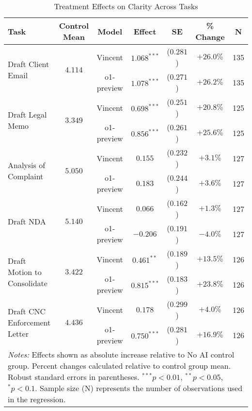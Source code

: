 \begin{table}[!htbp]
\centering
\caption{Treatment Effects on Clarity Across Tasks}
\label{tab:clarity_effects}
\begin{tabular}{lcccccc}
\hline\hline
Task & Control Mean & Model & Effect & SE & \% Change & N \\
\hline
\multirow{2}{*}{Draft Client Email} & \multirow{2}{*}{$4.114$} & Vincent & $1.068^{***}$ & ($0.281$) & $+26.0\%$ & 135 \\
& & o1-preview & $1.078^{***}$ & ($0.271$) & $+26.2\%$ & 135 \\
\hline
\multirow{2}{*}{Draft Legal Memo} & \multirow{2}{*}{$3.349$} & Vincent & $0.698^{***}$ & ($0.251$) & $+20.8\%$ & 125 \\
& & o1-preview & $0.856^{***}$ & ($0.261$) & $+25.6\%$ & 125 \\
\hline
\multirow{2}{*}{Analysis of Complaint} & \multirow{2}{*}{$5.050$} & Vincent & $0.155$ & ($0.232$) & $+3.1\%$ & 127 \\
& & o1-preview & $0.183$ & ($0.244$) & $+3.6\%$ & 127 \\
\hline
\multirow{2}{*}{Draft NDA} & \multirow{2}{*}{$5.140$} & Vincent & $0.066$ & ($0.162$) & $+1.3\%$ & 127 \\
& & o1-preview & $-0.206$ & ($0.191$) & $-4.0\%$ & 127 \\
\hline
\multirow{2}{*}{Draft Motion to Consolidate} & \multirow{2}{*}{$3.422$} & Vincent & $0.461^{**}$ & ($0.189$) & $+13.5\%$ & 126 \\
& & o1-preview & $0.815^{***}$ & ($0.183$) & $+23.8\%$ & 126 \\
\hline
\multirow{2}{*}{Draft CNC Enforcement Letter} & \multirow{2}{*}{$4.436$} & Vincent & $0.178$ & ($0.299$) & $+4.0\%$ & 126 \\
& & o1-preview & $0.750^{***}$ & ($0.281$) & $+16.9\%$ & 126 \\
\hline
\multicolumn{7}{p{0.95\linewidth}}{\footnotesize \textit{Notes:} Effects shown as absolute increase relative to No AI control group. Percent changes calculated relative to control group mean. Robust standard errors in parentheses. $^{***}p<0.01$, $^{**}p<0.05$, $^{*}p<0.1$. Sample size (N) represents the number of observations used in the regression.}
\end{tabular}
\end{table}